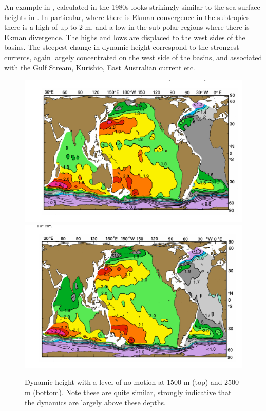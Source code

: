 An example in , calculated in the 1980s looks strikingly similar to the sea surface heights in .  In particular, where there is Ekman convergence in the subtropics there is a high of up to 2 m, and a low in the sub-polar regions where there is Ekman divergence.  The highs and lows are displaced to the west sides of the basins.  The steepest change in dynamic height correspond to the strongest currents, again largely concentrated on the west side of the basins, and associated with the Gulf Stream, Kurishio, East Australian current etc.  

\begin{figure}[hbt]
  \begin{center}
    \includegraphics{figs/Geostrophic/DynamicHeight1500}
    \includegraphics{figs/Geostrophic/DynamicHeight2500}
    \caption{Dynamic height with a level of no motion at 1500 m (top) and 2500 m (bottom).  Note these are quite similar, strongly indicative that the dynamics are largely above these depths.  }
    \label{fig:DynamicHeight}  
  \end{center}
\end{figure}

